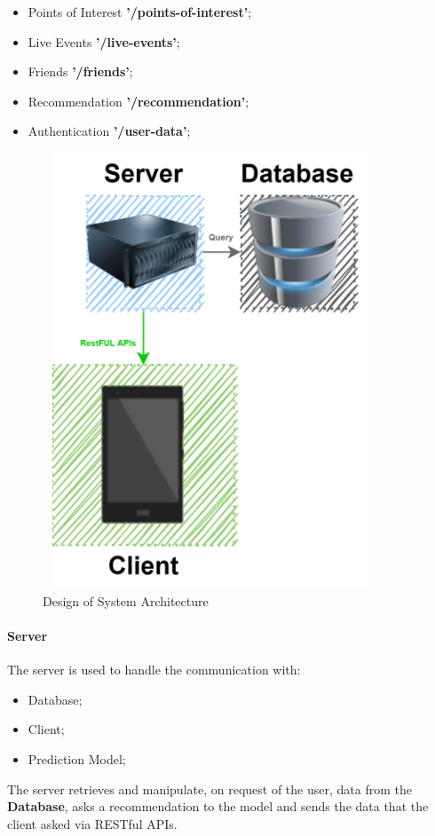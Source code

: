 \documentclass[../../main]{subfiles}
\begin{document}
\begin{itemize}
    \item Points of Interest \textbf{'/points-of-interest'};
    \item Live Events \textbf{'/live-events'};
    \item Friends \textbf{'/friends'};
    \item Recommendation \textbf{'/recommendation'};

    \item Authentication \textbf{'/user-data'};

\end{itemize}
    \begin{figure}[h]
        \centering
        \includegraphics[width=100mm,height=130mm]{images/simple.png}
        \caption{Design of System Architecture}\label{fig:simple_system_architecture}
    \end{figure}

\paragraph*{Server}
The server is used to handle the communication with:
\begin{itemize}
    \item Database;
    \item Client;
    \item Prediction Model;
\end{itemize}
The server retrieves and manipulate, on request of the user, data from the \textbf{Database}, 
asks a recommendation to the model and sends the data that the client asked via RESTful APIs.
\end{document}
